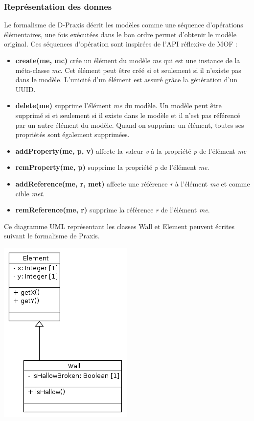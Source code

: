 \documentclass[a4paper,14pt]{article}
\begin{document}
\subsubsection{Représentation des donnes}
Le formalisme de D-Praxis décrit les modèles  comme une séquence d'opérations élémentaires, une fois exécutées dans le bon ordre permet d'obtenir le modèle original. Ces séquences d'opération sont inspirées de l'API réflexive de MOF :
\begin{itemize}
\item \textbf{create(me, mc)} crée un élément du modèle \textit{me} qui est une instance de la méta-classe \textit{mc}. Cet élément peut être créé si et seulement si il n'existe pas dans le modèle. L'unicité d'un élément est assuré grâce  la génération d'un UUID.
\item \textbf{delete(me)} supprime l'élément \textit{me} du modèle. Un modèle peut être supprimé si et seulement si il existe dans le modèle et  il n'est pas référencé par un autre élément du modèle. Quand on supprime un élément, toutes ses propriétés sont également supprimées.
\item \textbf{addProperty(me, p, v)} affecte la valeur \textit{v}  à la propriété \textit{p} de l'élément \textit{me}
\item \textbf{remProperty(me, p)} supprime la propriété \textit{p} de l'élément \textit{me}.
\item \textbf{addReference(me, r, met)} affecte une référence \textit{r} à l'élément \textit{me} et comme cible \textit{met}.
\item \textbf{remReference(me, r)} supprime la référence \textit{r} de l'élément \textit{me}.
\end{itemize}
Ce diagramme UML représentant les classes Wall et Element peuvent écrites suivant le formalisme de Praxis.
\newline

\includegraphics[scale=1]{./figure/model1.png} 
\end{document}
